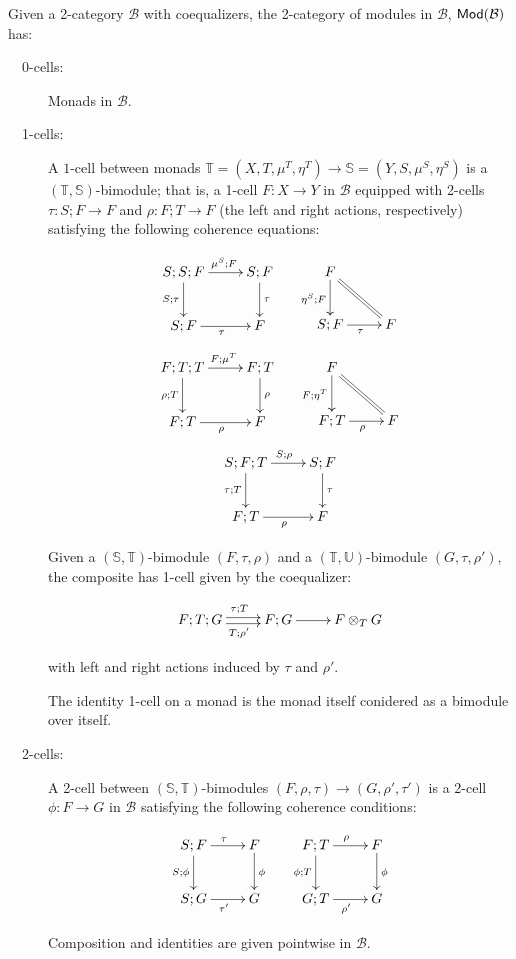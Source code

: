 \begin{definition}
Given a 2-category $\mathcal B$ with coequalizers,
the 2-category of modules in $\mathcal B$, ${\sf Mod}(\mathcal{B})$ has:

\begin{description}
\item[\ \ 0-cells:] Monads in $\mathcal B$.
\item[\ \ 1-cells:] A $1$-cell between monads $\mathbb{T}=(X,T,\mu^T,\eta^T)\to \mathbb{S}=(Y,S,\mu^S,\eta^S)$ is a $(\mathbb{T},\mathbb{S})$-bimodule; that is, a 1-cell $F:X\to Y$ in $\mathcal B$ equipped with 2-cells $\tau:S;F\to F$ and $\rho:F;T\to F$ (the left and right actions, respectively) satisfying the following coherence equations: 


$$
\xymatrix{
 S;S;F \ar[r]^{\ \mu^S;F} \ar[d]_{S;\tau}
  & S;F \ar[d]^{\tau}
\\S;F \ar[r]_{\tau}
  &F
}
\hspace{.5cm}
\xymatrix{
  F \ar@{=}[dr] \ar[d]_{\eta^S;F} 
\\S;F \ar[r]_{\tau}
   & F
}
$$
$$
\xymatrix{
 F;T;T \ar[r]^{\ F;\mu^T} \ar[d]_{\rho;T}
  & F;T \ar[d]^{\rho}
\\F;T \ar[r]_{\rho}
  &F
}
\hspace{.5cm}
\xymatrix{
  F \ar@{=}[dr] \ar[d]_{F;\eta^T} 
\\F;T \ar[r]_{\rho}
   & F
}
$$
$$
\xymatrix{
S;F;T \ar[r]^{S;\rho} \ar[d]_{\tau;T}
& S;F \ar[d]^{\tau}\\
F;T \ar[r]_{\rho}
& F
}
$$


Given a $(\mathbb{S},\mathbb{T})$-bimodule $(F,\tau,\rho)$ and a  $(\mathbb{T},\mathbb{U})$-bimodule $(G,\tau,\rho')$, the composite has 1-cell given by the coequalizer:

$$
\xymatrix{
F;T;G  \ar@<-.5ex>[r]_{T;\rho'} \ar@<.5ex>[r]^{\tau;T} & F;G \ar[r] &F \otimes_T G 
}
$$

with left and right actions induced by $\tau$ and $\rho'$.

The identity 1-cell on a monad is the monad itself conidered as a bimodule over itself.

\item[\ \ 2-cells:] A 2-cell between $(\mathbb{S},\mathbb{T})$-bimodules $(F,\rho,\tau)\to (G,\rho',\tau')$ is a 2-cell $\phi:F\to G$ in $\mathcal{B}$ satisfying the following coherence conditions:

$$
\xymatrix{
  S;F \ar[r]^{\tau}  \ar[d]_{S;\phi}
   & F \ar[d]^{\phi}
\\S;G \ar[r]_{\tau'}
   &G
}
\hspace*{.5cm}
\xymatrix{
  F;T \ar[r]^{\rho}  \ar[d]_{\phi;T}
   & F \ar[d]^{\phi}
\\G;T \ar[r]_{\rho'}
   &G
}
$$

Composition and identities are given pointwise in $\mathcal B$.
\end{description}
\end{definition}

